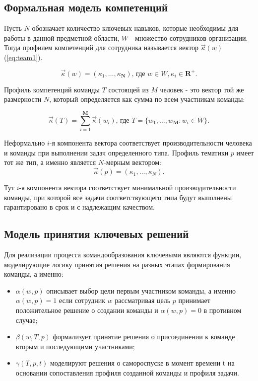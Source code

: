 \subsection{Формальная модель компетенций}

Пусть $N$ обозначает количество ключевых навыков, которые необходимы для работы в данной предметной области, $W$ - множество сотрудников организации. 
Тогда профилем компетенций для сотрудника называется вектор $\vec{\kappa} \left( w \right)$ (\ref{eq:team1}).

\begin{equation}\label{eq:team1}
\vec{\kappa}\left( w \right) = (\kappa_1, \ldots, \kappa_{\textbf{N}}) \mbox{, где } w\in {W}, \kappa_i \in \mathbf{R}^{+}.
\end{equation}

Профиль компетенций команды $T$ состоящей из $M$ человек - это вектор той же размерности $N$, который определяется как сумма по всем участникам команды:

\begin{equation}\label{eq:team2}
\vec{\kappa} \left( T \right)  = \sum_{i=1}^{\textbf{M}}
\vec{\kappa} \left( w_i \right) \mbox{, где } 
T= \{w_1, \ldots, w_{\textbf{M}} : w_i \in {W} \}.
\end{equation}

Неформально $i$-я компонента вектора соответствует производительности человека и команды при выполнении задач определенного типа.
Профиль тематики $p$ имеет тот же тип, а именно является $N$-мерным вектором:
\begin{equation}\label{eq:team3}
\vec{\kappa}(p) = (\kappa_1, \ldots, \kappa_N).
\end{equation}

Тут $i$-я компонента вектора соответствует минимальной производительности команды, при которой все задачи соответствующего типа будут выполнены гарантировано в срок и с надлежащим качеством.

\subsection{Модель принятия ключевых решений}

Для реализации процесса командообразования ключевыми являются функции, моделирующие логику принятия решения на разных этапах формирования команды, а именно:
\begin{itemize}
\item $\alpha(w, p)$ описывает выбор цели первым участником команды, а именно $\alpha(w, p)=1$ если сотрудник $w$ рассматривая цель $p$ принимает положительное решение о создании команды и $\alpha(w, p)=0$ в противном случае; 
\item $\beta(w, T, p)$ формализует принятие решения о присоединении к команде вторым и последующими участниками;
\item $\gamma(T, p, t)$ моделируют решения  о самороспуске в момент времени t на основании сопоставления профиля созданной команды и профиля задачи. 
\end{itemize}

